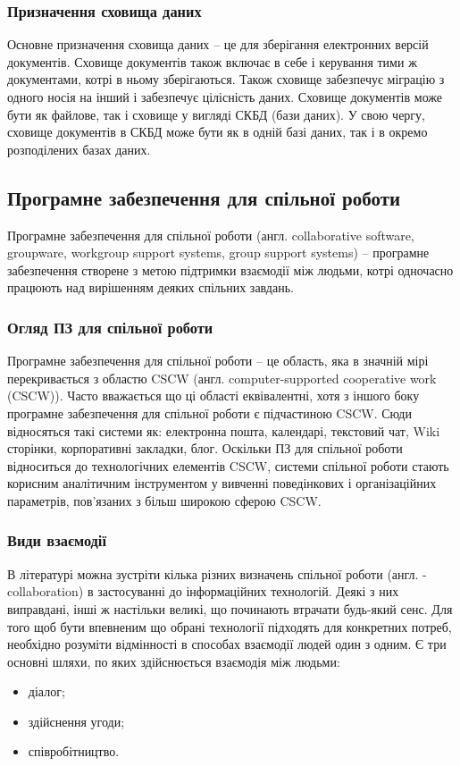 \subsubsection{Призначення сховища даних}
Основне призначення сховища даних -- це для зберігання електронних версій документів. 
Сховище документів також включає в себе і керування тими ж документами, котрі в ньому зберігаються.
Також сховище забезпечує міграцію з одного носія на інший і забезпечує цілісність даних.
Сховище документів може бути як файлове, так і сховище у вигляді СКБД (бази даних). 
У свою чергу, сховище документів в СКБД може бути як в одній базі даних, так і в окремо розподілених базах даних.
        

\subsection{Програмне забезпечення для спільної роботи}
Програмне забезпечення для спільної роботи (англ. collaborative software, groupware, workgroup support systems, group support systems) -- програмне забезпечення створене з метою підтримки взаємодії між людьми, котрі одночасно працюють над вирішенням деяких спільних завдань. 

\subsubsection{Огляд ПЗ для спільної роботи}
Програмне забезпечення для спільної роботи -- це область, яка в значній мірі перекривається з областю CSCW (англ. computer-supported cooperative work (CSCW)).
Часто вважається що ці області еквівалентні, хотя з іншого боку програмне забезпечення для спільної роботи є підчастиною CSCW.
Сюди відносяться такі системи як: електронна пошта, календарі, текстовий чат, Wiki сторінки, корпоративні закладки, блог.
Оскільки ПЗ для спільної роботи відноситься до технологічних елементів CSCW, системи спільної роботи стають корисним аналітичним інструментом у вивченні поведінкових і організаційних параметрів, пов'язаних з більш широкою сферою CSCW.

\subsubsection{Види взаємодії}
В літературі можна зустріти кілька різних визначень спільної роботи (англ. - collaboration) в застосуванні до інформаційних технологій. Деякі з них виправдані, інші ж настільки великі, що починають втрачати будь-який сенс.
Для того щоб бути впевненим що обрані технології підходять для конкретних потреб, необхідно розуміти відмінності в способах взаємодії людей один з одним.
Є три основні шляхи, по яких здійснюється взаємодія між людьми: 
\begin{itemize}
\item діалог;
\item здійснення угоди;
\item співробітництво.
\end{itemize}

